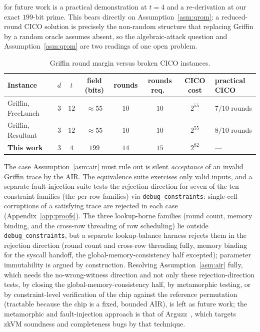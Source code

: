 for future work is a practical demonstration at $t=4$ and a re-derivation at our exact $199$-bit prime. This bears directly on Assumption~\ref{asm:qrom}: a reduced-round CICO solution is precisely the non-random structure that replacing Griffin by a random oracle assumes absent, so the algebraic-attack question and Assumption~\ref{asm:qrom} are two readings of one open problem.

\begin{table}[H]
    \centering
    \small
    \begin{tabular}{lccccccl}
        \toprule
        Instance & $d$ & $t$ & field (bits) & rounds & rounds req.\ & CICO cost & practical CICO \\
        \midrule
        Griffin, FreeLunch~\cite{freelunch2024}  & $3$ & $12$ & ${\approx}55$ & $10$ & $10$ & $2^{55}$ & $7/10$ rounds \\
        Griffin, Resultant~\cite{resultant2025}  & $3$ & $12$ & ${\approx}55$ & $10$ & $10$ & $2^{55}$ & $8/10$ rounds \\
        \textbf{This work}                       & $3$ & $4$  & $199$         & $14$ & $15$ & $2^{82}$  & --- \\
        \bottomrule
    \end{tabular}
    \caption{Griffin round margin versus broken CICO instances.}
    \label{tab:round-margin}
\end{table}

The case Assumption~\ref{asm:air} must rule out is silent \emph{acceptance} of an invalid Griffin trace by the AIR. The equivalence suite exercises only valid inputs, and a separate fault-injection suite tests the rejection direction for seven of the ten constraint families (the per-row families) via \texttt{debug\_constraints}: single-cell corruptions of a satisfying trace are rejected in each case (Appendix~\ref{app:proofs}). The three lookup-borne families (round count, memory binding, and the cross-row threading of row scheduling) lie outside \texttt{debug\_constraints}, but a separate lookup-balance harness rejects them in the rejection direction (round count and cross-row threading fully, memory binding for the syscall handoff, the global-memory-consistency half excepted); parameter immutability is argued by construction. Resolving Assumption~\ref{asm:air} fully, which needs the no-wrong-witness direction and not only these rejection-direction tests, by closing the global-memory-consistency half, by metamorphic testing, or by constraint-level verification of the chip against the reference permutation (tractable because the chip is a fixed, bounded AIR), is left as future work; the metamorphic and fault-injection approach is that of Arguzz~\cite{hochrainer2025arguzz}, which targets zkVM soundness and completeness bugs by that technique.

